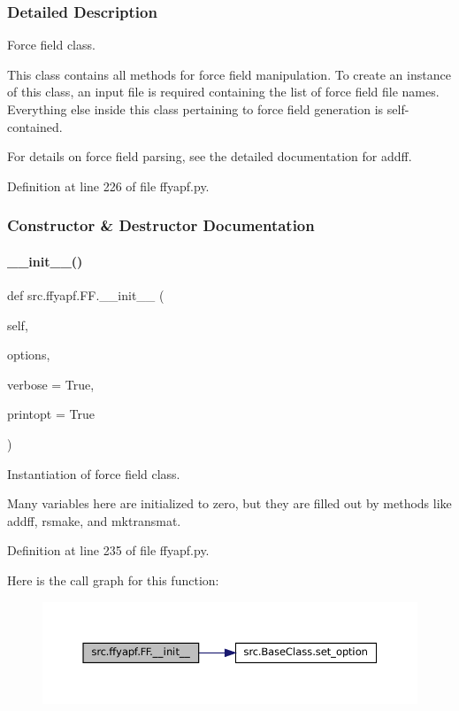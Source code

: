 \subsubsection{Detailed Description}
Force field class. 

This class contains all methods for force field manipulation. To create an instance of this class, an input file is required containing the list of force field file names. Everything else inside this class pertaining to force field generation is self-\/contained.

For details on force field parsing, see the detailed documentation for addff. 

Definition at line 226 of file ffyapf.\+py.



\subsubsection{Constructor \& Destructor Documentation}
\mbox{\label{classsrc_1_1ffyapf_1_1FF_a7a0ef2ed603c05f3566c07eb1ec26708}} 
\paragraph{\texorpdfstring{\+\_\+\+\_\+init\+\_\+\+\_\+()}{\_\_init\_\_()}}
{\footnotesize\ttfamily def src.\+ffyapf.\+F\+F.\+\_\+\+\_\+init\+\_\+\+\_\+ (\begin{DoxyParamCaption}\item[{}]{self,  }\item[{}]{options,  }\item[{}]{verbose = {\ttfamily True},  }\item[{}]{printopt = {\ttfamily True} }\end{DoxyParamCaption})}



Instantiation of force field class. 

Many variables here are initialized to zero, but they are filled out by methods like addff, rsmake, and mktransmat. 

Definition at line 235 of file ffyapf.\+py.

Here is the call graph for this function\+:
\nopagebreak
\begin{figure}[H]
\begin{center}
\leavevmode
\includegraphics[width=350pt]{classsrc_1_1ffyapf_1_1FF_a7a0ef2ed603c05f3566c07eb1ec26708_cgraph}
\end{center}
\end{figure}


